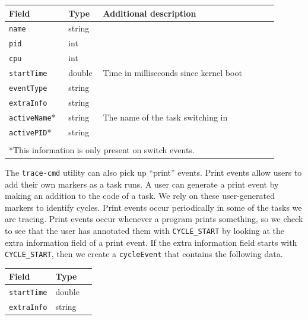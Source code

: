 \documentclass{hmcclinic}
\begin{document}
  \begin{center}
    \begin{tabular}{p{0.2\linewidth}p{0.1\linewidth}p{0.6\linewidth}}
      \toprule
      Field     & Type   & Additional description                 \\
      \midrule
       \texttt{name}      & string &                                        \\
       \texttt{pid}       & int    &                                        \\
       \texttt{cpu}       & int    &                                        \\
       \texttt{startTime} & double & Time in milliseconds since kernel boot \\
       \texttt{eventType} & string &                                        \\
      \texttt{extraInfo} & string &                                        \\
       \texttt{activeName}* & string & The name of the task switching in      \\
       \texttt{activePID}*  & string &                                        \\
      \bottomrule\\
\multicolumn{3}{l}{ *This information is only present on switch events.}
    \end{tabular}
  \end{center}

 

  The \texttt{trace-cmd} utility can also pick up ``print'' events. Print events allow users to add
  their own markers as a task runs. A user can generate a print event by making
  an addition to the code of a task. We rely on these user-generated markers to
  identify cycles. Print events occur periodically in some of the tasks we are
  tracing. Print events occur whenever a program prints something, so we check to see
  that the user has annotated them with \texttt{CYCLE\_START} by looking at the extra
  information field of a print event. If the extra information field starts with
  \texttt{CYCLE\_START}, then we create a \texttt{cycleEvent} that contains the following data.

  \begin{center}
    \begin{tabular}{lll}
      \toprule
      Field     & Type                \\
      \midrule
       \texttt{startTime}      & double                               \\
       \texttt{extraInfo}       & string                              \\
      \bottomrule
    \end{tabular}
  \end{center}
\end{document}

